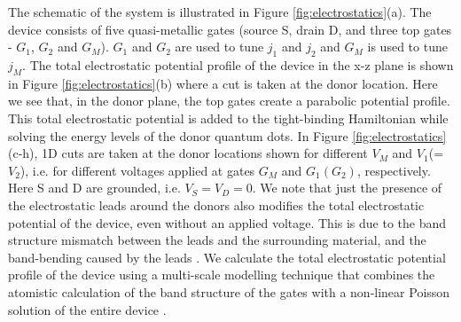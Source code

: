 \documentclass[%
showkeys,
 amsmath,amssymb,
 aps,
prb,
]{revtex4-2}
\begin{document}
The schematic of the system is illustrated in Figure \ref{fig:electrostatics}(a). The device consists of five quasi-metallic gates (source S, drain D, and three top gates - $G_1$, $G_2$ and $G_M$). $G_1$ and $G_2$  are used to tune $j_1$ and $j_2$ and $G_M$ is used to tune $j_M$. The total electrostatic potential profile of the device in the x-z plane is shown in Figure \ref{fig:electrostatics}(b) where a cut is taken at the donor location. Here we see that, in the donor plane, the top gates create a parabolic potential profile. This total electrostatic potential is added to the tight-binding Hamiltonian while solving the energy levels of the donor quantum dots. In Figure \ref{fig:electrostatics}(c-h), 1D cuts are taken at the donor locations shown for different $V_M$ and $V_1$(=$V_2$), i.e. for different voltages applied at gates $G_M$ and $G_1(G_2)$, respectively. Here S and D are grounded, i.e. $V_S = V_D = 0$. We note that just the presence of the electrostatic leads around the donors also modifies the total electrostatic potential of the device, even without an applied voltage. This is due to the band structure mismatch between the leads and the surrounding material, and the band-bending caused by the leads \cite{ryu2013atomistic}. We calculate the total electrostatic potential profile of the device using a multi-scale modelling technique that combines the atomistic calculation of the band structure of the gates with a non-linear Poisson solution of the entire device \cite{donnelly2023multi}. 
\end{document}
